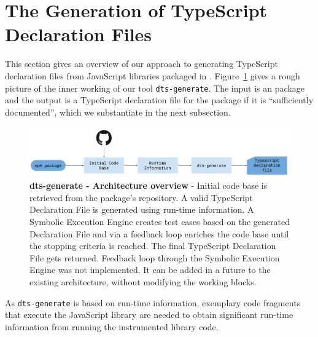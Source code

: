 \documentclass[english,cleveref,autoref,submission]{programming}
\newcommand{\figref}[1]{Figure~\ref{#1}}
\begin{document}
\section{The Generation of TypeScript Declaration Files}
\label{sec:gener-typescr-decl}
This section gives an overview of our approach to generating
TypeScript declaration files from JavaScript libraries packaged in
\NPM. \figref{fig:tsd_generation_method_block_diagram} gives a rough
picture of the inner working of our tool \texttt{dts-generate}. The
input is an \NPM{} package and the output is a TypeScript declaration
file for the package if it is ``sufficiently documented'', which we
substantiate in the next subsection.


\begin{figure}[tp]
    \centering
    \includegraphics[width=1\linewidth]{dts-generate-block-diagram.pdf}
    \caption[dts-generate - Architecture overview]{\textbf{dts-generate - Architecture overview} - Initial code base is retrieved from the \NPM{} package's repository. A valid TypeScript Declaration File is generated using run-time information. A Symbolic Execution Engine creates test cases based on the generated Declaration File and via a feedback loop enriches the code base until the stopping criteria is reached. The final TypeScript Declaration File gets returned. Feedback loop through the Symbolic Execution Engine was not implemented. It can be added in a future to the existing architecture, without modifying the working blocks.}
    \label{fig:tsd_generation_method_block_diagram}
  \end{figure}

As \texttt{dts-generate} is based on run-time information, 
exemplary code fragments that execute the JavaScript library are
needed to obtain 
significant run-time information from running the instrumented library
code.
\end{document}
